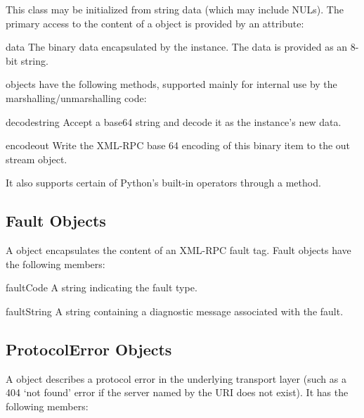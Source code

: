 This class may be initialized from string data (which may include NULs).
The primary access to the content of a  object is
provided by an attribute:

\begin{memberdesc}[Binary]{data}
The binary data encapsulated by the  instance.  The data
is provided as an 8-bit string.
\end{memberdesc}

 objects have the following methods, supported mainly
for internal use by the marshalling/unmarshalling code:

\begin{methoddesc}[Binary]{decode}{string}
Accept a base64 string and decode it as the instance's new data.
\end{methoddesc}

\begin{methoddesc}[Binary]{encode}{out}
Write the XML-RPC base 64 encoding of this binary item to the out
stream object.
\end{methoddesc}

It also supports certain of Python's built-in operators through a
 method.


\subsection{Fault Objects \label{fault-objects}}

A  object encapsulates the content of an XML-RPC fault tag.
Fault objects have the following members:

\begin{memberdesc}{faultCode}
A string indicating the fault type.
\end{memberdesc}

\begin{memberdesc}{faultString}
A string containing a diagnostic message associated with the fault.
\end{memberdesc}


\subsection{ProtocolError Objects \label{protocol-error-objects}}

A  object describes a protocol error in the
underlying transport layer (such as a 404 `not found' error if the
server named by the URI does not exist).  It has the following
members:

